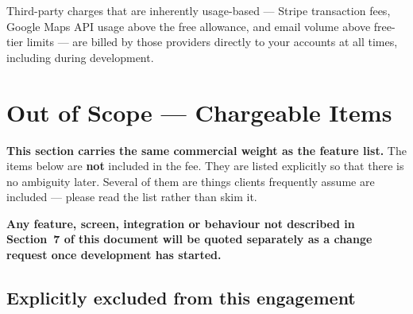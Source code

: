 \documentclass[11pt,a4paper]{article}
\begin{document}
\vspace{6pt}
{\color{brandgrey}\footnotesize Third-party charges that are inherently
usage-based --- Stripe transaction fees, Google Maps API usage above the free
allowance, and email volume above free-tier limits --- are billed by those providers
directly to your accounts at all times, including during development.}

\clearpage

\section{Out of Scope --- Chargeable Items}

\begin{accentbox}
\textbf{This section carries the same commercial weight as the feature list.} The items
below are \textbf{not} included in the  fee. They are listed explicitly so
that there is no ambiguity later. Several of them are things clients frequently assume
are included --- please read the list rather than skim it.

\textbf{Any feature, screen, integration or behaviour not described in Section~7 of this
document will be quoted separately as a change request once development has started.}
\end{accentbox}

\subsection{Explicitly excluded from this engagement}
\end{document}
